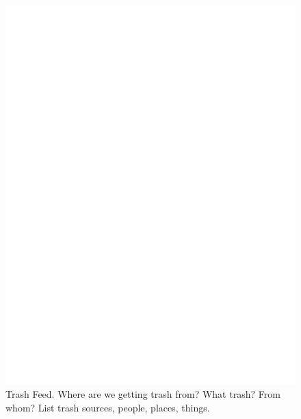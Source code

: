 \documentclass{report}
\begin{document}
\begin{figure}
	\centering
	\includegraphics[width=5in]{imageserver/uploadimages/image3.png}
	\caption{Trash Feed. Where are we getting trash from? What trash? From whom?  List trash sources, people, places, things.}
\end{figure}
\end{document}
